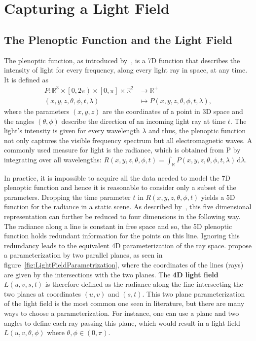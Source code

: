 \chapter{Capturing a Light Field}

\section{The Plenoptic Function and the Light Field}

The plenoptic function, as introduced by~\cite{AdelsonBergen}, is a 7D function that describes the intensity of light for every frequency, along every light ray in space, at any time. 
It is defined as
\begin{align*}
	P \colon \mathbb{R}^3 \times \left[0, 2 \pi \right) \times \left[ 0, \pi \right] \times \mathbb{R}^2 & \to \mathbb{R}^+ \\
	\left(x, y, z, \theta, \phi, t, \lambda \right) & \mapsto P\left(x, y, z, \theta, \phi, t, \lambda \right), 
\end{align*}
where the parameters $\left(x, y, z\right)$ are the coordinates of a point in 3D space and the angles $\left(\theta, \phi \right)$ describe the direction of an incoming light ray at time $t$. 
The light's intensity is given for every wavelength $\lambda$ and thus, the plenoptic function not only captures the visible frequency spectrum but all electromagnetic waves. 
A commonly used measure for light is the radiance, which is obtained from P by integrating over all wavelengths: 
$R\left(x, y, z, \theta, \phi, t\right) = \int_{\mathbb{R}} \! P\left(x, y, z, \theta, \phi, t, \lambda \right) \, \mathrm{d} \lambda$.

In practice, it is impossible to acquire all the data needed to model the 7D plenoptic function and hence it is reasonable to consider only a subset of the parameters. 
Dropping the time parameter $t$ in $R\left( x, y, z, \theta, \phi, t \right) $ yields a 5D function for the radiance in a static scene. 
As described by~\cite{LightFieldRendering}, this five dimensional representation can further be reduced to four dimensions in the following way. 
The radiance along a line is constant in free space and so, the 5D plenoptic function holds redundant information for the points on this line. 
Ignoring this redundancy leads to the equivalent 4D parameterization of the ray space. 
\cite{LightFieldRendering} propose a parameterization by two parallel planes, as seen in figure~\ref{fig:LightFieldParametrization}, where the coordinates of the lines (rays) are given by the intersections with the two planes.
The \textbf{4D light field} $L(u, v, s, t)$ is therefore defined as the radiance along the line intersecting the two planes at coordinates $(u, v)$ and $(s, t)$.
This two plane parameterization of the light field is the most common one seen in literature, but there are many ways to choose a parameterization.
For instance, one can use a plane and two angles to define each ray passing this plane, which would result in a light field $L(u, v, \theta, \phi)$ where $\theta, \phi \in (0, \pi)$.

